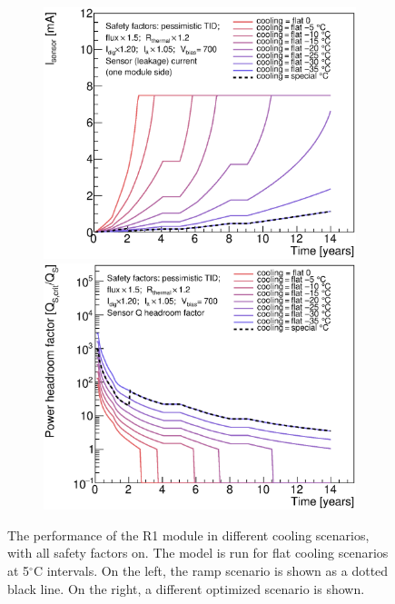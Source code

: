 \begin{figure}[ht!]
\begin{subfigure}[t]{0.50\textwidth}
\begin{center}
\includegraphics[width=0.74\linewidth]{figures/studies/SensorCurrent_CompareR1_Proposal.eps}
\includegraphics[width=0.74\linewidth]{figures/studies/SensorQHeadroom_CompareR1_Proposal.eps}
\end{center}
\end{subfigure}
\caption{The performance of the R1 module in different cooling scenarios, with all safety factors on.
The model is run for flat cooling scenarios at 5$^{\circ}$C intervals. On the left, the ramp scenario
is shown as a dotted black line. On the right, a different optimized scenario is shown.
 }
\label{dedicated_study}
\end{figure}



